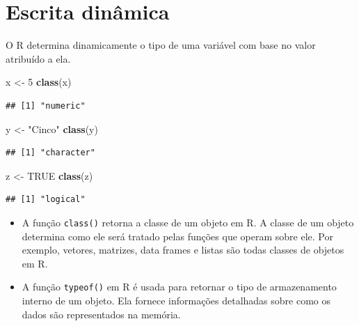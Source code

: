 \documentclass[
]{book}
\newenvironment{Shaded}{\begin{snugshade}}{\end{snugshade}}
\newcommand{\ConstantTok}[1]{\textcolor[rgb]{0.56,0.35,0.01}{#1}}
\newcommand{\DecValTok}[1]{\textcolor[rgb]{0.00,0.00,0.81}{#1}}
\newcommand{\FunctionTok}[1]{\textcolor[rgb]{0.13,0.29,0.53}{\textbf{#1}}}
\newcommand{\NormalTok}[1]{#1}
\newcommand{\OtherTok}[1]{\textcolor[rgb]{0.56,0.35,0.01}{#1}}
\newcommand{\StringTok}[1]{\textcolor[rgb]{0.31,0.60,0.02}{#1}}
\theoremstyle{definition}
\theoremstyle{definition}
\theoremstyle{definition}
\theoremstyle{definition}
\theoremstyle{remark}
\begin{document}
\section{Escrita dinâmica}\label{escrita-dinuxe2mica}

O R determina dinamicamente o tipo de uma variável com base no valor atribuído a ela.

\begin{Shaded}
\begin{Highlighting}[]
\NormalTok{x }\OtherTok{\textless{}{-}} \DecValTok{5}         
\FunctionTok{class}\NormalTok{(x) }
\end{Highlighting}
\end{Shaded}

\begin{verbatim}
## [1] "numeric"
\end{verbatim}

\begin{Shaded}
\begin{Highlighting}[]
\NormalTok{y }\OtherTok{\textless{}{-}} \StringTok{"Cinco"}   
\FunctionTok{class}\NormalTok{(y) }
\end{Highlighting}
\end{Shaded}

\begin{verbatim}
## [1] "character"
\end{verbatim}

\begin{Shaded}
\begin{Highlighting}[]
\NormalTok{z }\OtherTok{\textless{}{-}} \ConstantTok{TRUE}  
\FunctionTok{class}\NormalTok{(z) }
\end{Highlighting}
\end{Shaded}

\begin{verbatim}
## [1] "logical"
\end{verbatim}

\begin{itemize}
\item
  A função \texttt{class()} retorna a classe de um objeto em R. A classe de um objeto determina como ele será tratado pelas funções que operam sobre ele. Por exemplo, vetores, matrizes, data frames e listas são todas classes de objetos em R.
\item
  A função \texttt{typeof()} em R é usada para retornar o tipo de armazenamento interno de um objeto. Ela fornece informações detalhadas sobre como os dados são representados na memória.
\end{itemize}
\end{document}
